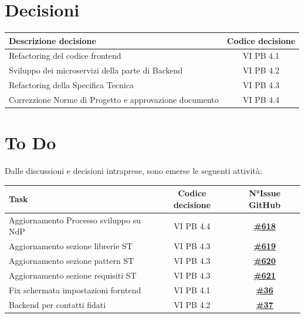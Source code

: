 \documentclass[a4paper,12pt]{article}
\newcommand{\ignoreglossary}{}
\begin{document}
\section{Decisioni}
\begin{center}
\small
\renewcommand{\arraystretch}{1.2} 
\begin{tabular}{|p{}|c|}
\hline
\rowcolor{gray!60} 
\textbf{Descrizione decisione} & \textbf{Codice decisione} \\
\hline
Refactoring del codice frontend& VI \ignoreglossary{PB} 4.1 \\
\hline
Sviluppo dei microservizi della parte di Backend &  VI \ignoreglossary{PB} 4.2 \\
\hline
Refactoring della Specifica Tecnica &  VI \ignoreglossary{PB} 4.3\\
\hline
Correzzione Norme di Progetto e approvazione documento &  VI \ignoreglossary{PB} 4.4\\
\hline
\end{tabular}
\end{center}
\pagebreak

\section{To Do}
Dalle discussioni e decisioni intraprese, sono emerse le seguenti attività:

\begin{center}
\small
\renewcommand{\arraystretch}{1.2} 
\begin{tabular}{|p{}|c|c|}
\hline
\rowcolor{gray!60} 
\textbf{Task} & \textbf{Codice decisione} & \textbf{N°Issue GitHub} \\
\hline
Aggiornamento Processo sviluppo su NdP & VI PB 4.4 & \href{https://github.com/SWE-BitByBit/SWE-docs/issues/618}{\textbf{\#618}} \\
\hline
Aggiornamento sezione librerie ST & VI PB 4.3 & \href{https://github.com/SWE-BitByBit/SWE-docs/issues/619}{\textbf{\#619}} \\
\hline
Aggiornamento sezione pattern ST & VI PB 4.3 & \href{https://github.com/SWE-BitByBit/SWE-docs/issues/620}{\textbf{\#620}} \\
\hline
Aggiornamento sezione requisiti ST & VI PB 4.3 & \href{https://github.com/SWE-BitByBit/SWE-docs/issues/621}{\textbf{\#621}} \\
\hline
Fix schermata impostazioni forntend & VI PB 4.1 & \href{https://github.com/SWE-BitByBit/project-MVP/issues/36}{\textbf{\#36}} \\
\hline
Backend per contatti fidati & VI PB 4.2 & \href{https://github.com/SWE-BitByBit/project-MVP/issues/37}{\textbf{\#37}} \\
\hline
\end{tabular}
\end{center}
\end{document}
